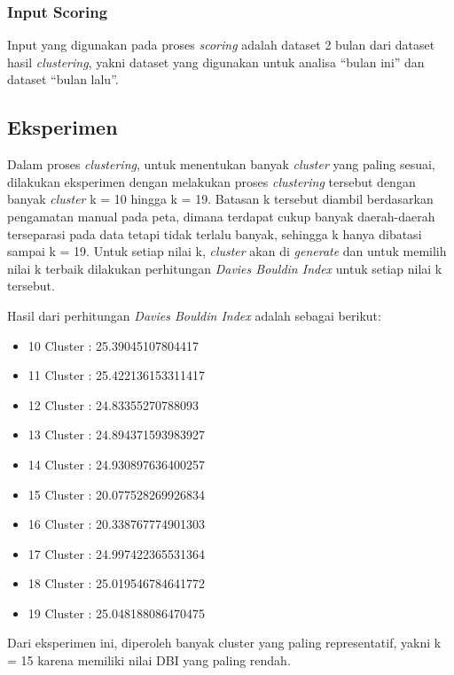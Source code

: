 \documentclass{article}
\begin{document}
\subsubsection{Input Scoring}

\begin{adjustwidth}{4em}{0pt}
	
	\hspace{\parindent}Input yang digunakan pada proses \textit{scoring} adalah dataset 2 bulan dari dataset hasil \textit{clustering}, yakni dataset yang digunakan untuk analisa ``bulan ini'' dan dataset ``bulan lalu''.
	
	
\end{adjustwidth}

\subsection{Eksperimen}

\begin{adjustwidth}{2em}{0pt}
	
\hspace{\parindent}Dalam proses \textit{clustering}, untuk menentukan banyak \textit{cluster} yang paling sesuai, dilakukan eksperimen dengan melakukan proses \textit{clustering} tersebut dengan banyak \textit{cluster} k = 10 hingga k = 19. Batasan k tersebut diambil berdasarkan pengamatan manual pada peta, dimana terdapat cukup banyak daerah-daerah terseparasi pada data tetapi tidak terlalu banyak, sehingga k hanya dibatasi sampai k = 19. Untuk setiap nilai k, \textit{cluster} akan di \textit{generate} dan untuk memilih nilai k terbaik dilakukan perhitungan \textit{Davies Bouldin Index} untuk setiap nilai k tersebut.

Hasil dari perhitungan \textit{Davies Bouldin Index} adalah sebagai berikut: 

\begin{itemize}
	\item{10 Cluster : 25.39045107804417}
	\item{11 Cluster : 25.422136153311417}
	\item{12 Cluster : 24.83355270788093}
	\item{13 Cluster : 24.894371593983927}
	\item{14 Cluster : 24.930897636400257}
	\item{15 Cluster : 20.077528269926834}
	\item{16 Cluster : 20.338767774901303}
	\item{17 Cluster : 24.997422365531364}
	\item{18 Cluster : 25.019546784641772}
	\item{19 Cluster : 25.048188086470475}	
\end{itemize}

Dari eksperimen ini, diperoleh banyak cluster yang paling representatif, yakni k = 15 karena memiliki nilai DBI yang paling rendah.

\end{adjustwidth}
\end{document}
